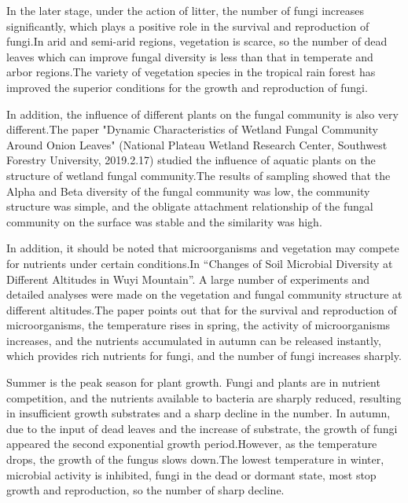 \documentclass[12pt]{article}
\begin{document}
In the later stage, under the action of litter, the number of fungi increases significantly, which plays a positive role in the survival and reproduction of fungi.In arid and semi-arid regions, vegetation is scarce, so the number of dead leaves which can improve fungal diversity is less than that in temperate and arbor regions.The variety of vegetation species in the tropical rain forest has improved the superior conditions for the growth and reproduction of fungi.\par  

In addition, the influence of different plants on the fungal community is also very different.The paper "Dynamic Characteristics of Wetland Fungal Community Around Onion Leaves" \cite{12}(National Plateau Wetland Research Center, Southwest Forestry University, 2019.2.17) studied the influence of aquatic plants on the structure of wetland fungal community.The results of sampling showed that the Alpha and Beta diversity of the fungal community was low, the community structure was simple, and the obligate attachment relationship of the fungal community on the surface was stable and the similarity was high.\par 

In addition, it should be noted that microorganisms and vegetation may compete for nutrients under certain conditions.In “Changes of Soil Microbial Diversity at Different Altitudes in Wuyi Mountain”\cite{12}. A large number of experiments and detailed analyses were made on the vegetation and fungal community structure at different altitudes.The paper points out that for the survival and reproduction of microorganisms, the temperature rises in spring, the activity of microorganisms increases, and the nutrients accumulated in autumn can be released instantly, which provides rich nutrients for fungi, and the number of fungi increases sharply. \par 

Summer is the peak season for plant growth. Fungi and plants are in nutrient competition, and the nutrients available to bacteria are sharply reduced, resulting in insufficient growth substrates and a sharp decline in the number. In autumn, due to the input of dead leaves and the increase of substrate, the growth of fungi appeared the second exponential growth period.However, as the temperature drops, the growth of the fungus slows down.The lowest temperature in winter, microbial activity is inhibited, fungi in the dead or dormant state, most stop growth and reproduction, so the number of sharp decline.\par 
\end{document}
